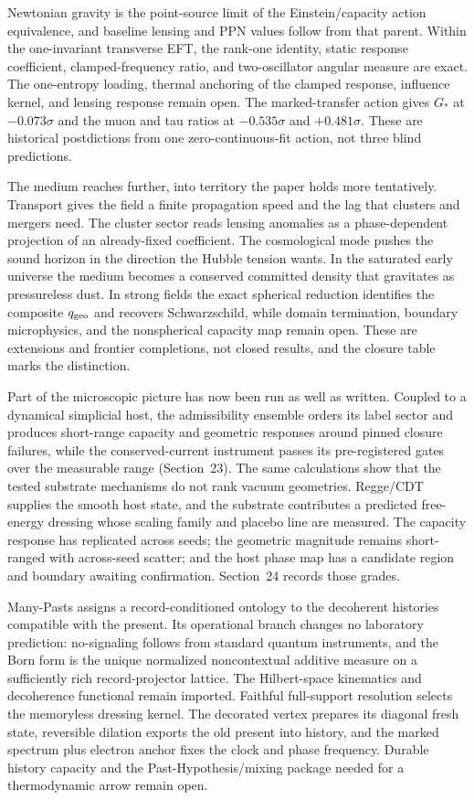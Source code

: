 \documentclass[11pt]{article}
\begin{document}
Newtonian gravity is the point-source limit of the Einstein/capacity action equivalence, and baseline lensing and PPN values follow from that parent. Within the one-invariant transverse EFT, the rank-one identity, static response coefficient, clamped-frequency ratio, and two-oscillator angular measure are exact. The one-entropy loading, thermal anchoring of the clamped response, influence kernel, and lensing response remain open. The marked-transfer action gives $G_*$ at $-0.073\sigma$ and the muon and tau ratios at $-0.535\sigma$ and $+0.481\sigma$. These are historical postdictions from one zero-continuous-fit action, not three blind predictions.

The medium reaches further, into territory the paper holds more tentatively. Transport gives the field a finite propagation speed and the lag that clusters and mergers need. The cluster sector reads lensing anomalies as a phase-dependent projection of an already-fixed coefficient. The cosmological mode pushes the sound horizon in the direction the Hubble tension wants. In the saturated early universe the medium becomes a conserved committed density that gravitates as pressureless dust. In strong fields the exact spherical reduction identifies the composite $q_{\rm geo}$ and recovers Schwarzschild, while domain termination, boundary microphysics, and the nonspherical capacity map remain open. These are extensions and frontier completions, not closed results, and the closure table marks the distinction.

Part of the microscopic picture has now been run as well as written. Coupled to a dynamical simplicial host, the admissibility ensemble orders its label sector and produces short-range capacity and geometric responses around pinned closure failures, while the conserved-current instrument passes its pre-registered gates over the measurable range (Section~23). The same calculations show that the tested substrate mechanisms do not rank vacuum geometries. Regge/CDT supplies the smooth host state, and the substrate contributes a predicted free-energy dressing whose scaling family and placebo line are measured. The capacity response has replicated across seeds; the geometric magnitude remains short-ranged with across-seed scatter; and the host phase map has a candidate region and boundary awaiting confirmation. Section~24 records those grades.

Many-Pasts assigns a record-conditioned ontology to the decoherent histories compatible with the present. Its operational branch changes no laboratory prediction: no-signaling follows from standard quantum instruments, and the Born form is the unique normalized noncontextual additive measure on a sufficiently rich record-projector lattice. The Hilbert-space kinematics and decoherence functional remain imported. Faithful full-support resolution selects the memoryless dressing kernel. The decorated vertex prepares its diagonal fresh state, reversible dilation exports the old present into history, and the marked spectrum plus electron anchor fixes the clock and phase frequency. Durable history capacity and the Past-Hypothesis/mixing package needed for a thermodynamic arrow remain open.
\end{document}

